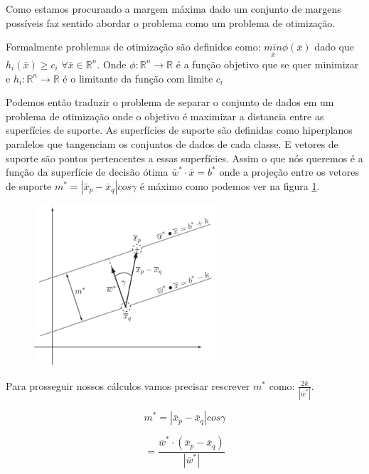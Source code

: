 Como estamos procurando a margem máxima dado um conjunto de margens possíveis faz sentido abordar o problema como um problema de otimização.

Formalmente problemas de otimização são definidos como: $\underset{\bar{x}}{min}\phi(\bar{x})$ dado que $h_i(\bar{x})\ge c_i$ $\forall \bar{x} \in \mathbb{R}^n$. Onde $\phi: \mathbb{R}^n\rightarrow \mathbb{R}$ é a função objetivo que se quer minimizar e $h_i:\mathbb{R}^n\rightarrow\mathbb{R}$ é o limitante da função com limite $c_i$

Podemos então traduzir o problema de separar o conjunto de dados em um problema de otimização onde o objetivo é maximizar a distancia entre as superfícies de suporte. As superfícies de suporte são definidas como hiperplanos paralelos que tangenciam os conjuntos de dados de cada classe. E vetores de suporte são pontos pertencentes a essas superfícies. Assim o que nós queremos é a função da superfície de decisão ótima $\bar{w}^*\cdot\bar{x}=b^*$ onde a projeção entre os vetores de suporte $m^*=|\bar{x}_p - \bar{x}_q|cos\gamma$ é máximo como podemos ver na figura \ref{fig:LABEL_FIG_4}. 

\begin{figure}
  \centering
  \includegraphics[width=0.6\textwidth]{imagens/svm_4.png}
  \label{fig:LABEL_FIG_4}
\end{figure}

Para prosseguir nossos cálculos vamos precisar rescrever $m^*$ como: $\frac{2k}{|\bar{w}^*|}$.

\begin{equation}
m^* = |\bar{x}_p-\bar{x}_q|cos\gamma
    \label{eq:LABEL_EQ_2}
\end{equation}

\begin{equation}
= \frac{\bar{w}^*\cdot(\bar{x}_p-\bar{x}_q)}{|\bar{w}^*|}
    \label{eq:LABEL_EQ_3}
\end{equation}

